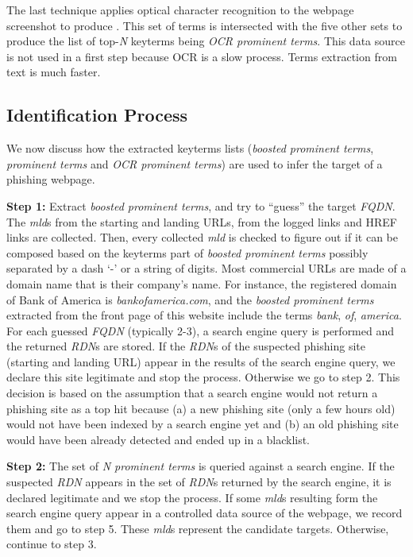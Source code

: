 \documentclass[10pt,conference,compsocconf,letterpaper]{IEEEtran}
\begin{document}
The last technique applies optical character recognition to the webpage screenshot to produce . This set of terms is intersected with the five other sets to produce the list of top-\textit{N} keyterms being \textit{OCR prominent terms}. This data source is not used in a first step because OCR is a slow process. Terms extraction from text is much faster. 


\subsection{Identification Process}
\label{subsec:identification}

We now discuss how the extracted keyterms lists (\textit{boosted prominent terms}, \textit{prominent terms} and \textit{OCR prominent terms}) are used to infer the target of a phishing webpage. 


\noindent\textbf{Step 1:}
Extract \textit{boosted prominent terms}, and try to ``guess'' the target \textit{FQDN}. The \textit{mld}s from the starting and landing URLs, from the logged links and HREF links are collected. Then, every collected \textit{mld} is checked to figure out if it can be composed based on the keyterms part of \textit{boosted prominent terms} possibly separated by a dash `-' or a string of digits.
\iffullversion
Most commercial URLs are made of a domain name that is their company's name. For instance, the registered domain of Bank of America is \textit{bankofamerica.com}, and the \textit{boosted prominent terms} extracted from the front page of this website include the terms \textit{bank}, \textit{of}, \textit{america}.
\fi
For each guessed \textit{FQDN} (typically 2-3), a search engine query is performed and the returned \textit{RDN}s are stored.
If the \textit{RDN}s of the suspected phishing site (starting and landing URL) appear in the results of the search engine query, we declare this site legitimate and stop the process. Otherwise we go to step 2.
This decision is based on the assumption that a search engine would not return a phishing site as a top hit because (a) a new phishing site (only a few hours old) would not have been indexed by a search engine yet and (b) an old phishing site would have been already detected and ended up in a blacklist.  

\noindent\textbf{Step 2:}
The set of \textit{N prominent terms} is queried against a search engine.
If the suspected \textit{RDN} appears in the set of \textit{RDN}s returned by the search engine, it is declared legitimate and we stop the process.
If some \textit{mld}s resulting form the search engine query appear in a controlled data source of the webpage, we record them and go to step 5. These \textit{mld}s represent the candidate targets. Otherwise, continue to step 3.
\end{document}
